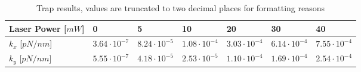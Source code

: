 \vspace{-.2cm}
\begin{table}[h!]
\centering
    \begin{tabular}{|l|l|l|l|l|l|l|}
        \hline
        Laser Power {[}$mW${]} & 0         & 5         & 10         & 20         & 30         & 40         \\ \hline
        $k_x$     {[}$pN/nm${]}       & $3.64\cdot 10^{-7}$ & $8.24\cdot 10^{-5}$ & $1.08\cdot 10^{-4}$ & $3.03\cdot 10^{-4}$ & $6.14\cdot 10^{-4}$ & $7.55\cdot 10^{-4}$ \\ \hline
        $k_y$     {[}$pN/nm${]}       & $5.55\cdot 10^{-7}$   & $4.18\cdot 10^{-5}$ & $2.53\cdot 10^{-5}$  & $1.10\cdot 10^{-4}$ & $1.69\cdot 10^{-4}$ & $2.54\cdot 10^{-4}$ \\ \hline
    \end{tabular}
\caption{Trap results, values are truncated to two decimal places for formatting reasons}
\label{tab:second-results}
\end{table}

